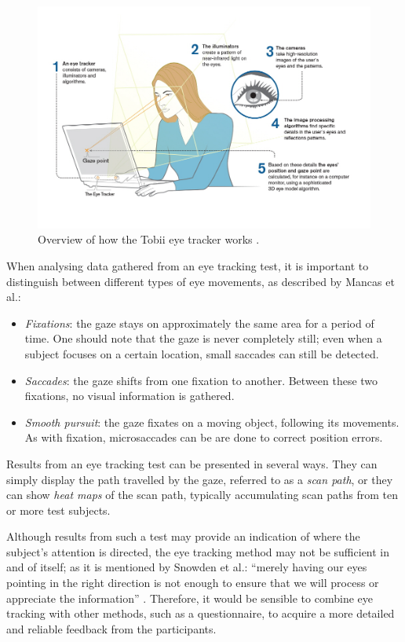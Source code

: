 \begin{figure}[h!]
	\centering
	\includegraphics[width=\textwidth]{figures/tobii.jpg}
	\caption{Overview of how the Tobii eye tracker works \cite{TobiiPro}.\label{fig:tobii}}
\end{figure}

When analysing data gathered from an eye tracking test, it is important to distinguish between different types of eye movements, as described by Mancas et al.:

\begin{itemize}
\item \textit{Fixations}: the gaze stays on approximately the same area for a period of time. One should note that the gaze is never completely still; even when a subject focuses on a certain location, small saccades can still be detected.
\item \textit{Saccades}: the gaze shifts from one fixation to another. Between these two fixations, no visual information is gathered.
\item \textit{Smooth pursuit}: the gaze fixates on a moving object, following its movements. As with fixation, microsaccades can be are done to correct position errors.
\end{itemize}

Results from an eye tracking test can be presented in several ways. They can simply display the path travelled by the gaze, referred to as a \textit{scan path}, or they can show \textit{heat maps} of the scan path, typically accumulating scan paths from ten or more test subjects. 

Although results from such a test may provide an indication of where the subject’s attention is directed, the eye tracking method may not be sufficient in and of itself; as it is mentioned by Snowden et al.: “merely having our eyes pointing in the right direction is not enough to ensure that we will process or appreciate the information” \cite{snowden2012basic}. Therefore, it would be sensible to combine eye tracking with other methods, such as a questionnaire, to acquire a more detailed and reliable feedback from the participants.
